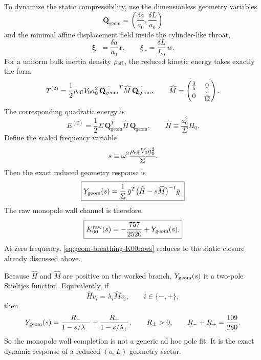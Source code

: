 \documentclass[11pt]{article}
\newcommand{\Qgeom}{\mathbf Q_{\geom}}
\newcommand{\geom}{\mathrm{geom}}
\begin{document}
To dynamize the static compressibility, use the dimensionless geometry variables
\begin{equation}
\Qgeom=\left(\frac{\delta a}{a_0},\frac{\delta L}{a_0}\right)
\label{eq:geom-breathing-Qgeom-vars}
\end{equation}
and the minimal affine displacement field inside the cylinder-like throat,
\begin{equation}
\boldsymbol\xi_\perp=\frac{\delta a}{a_0}\,\mathbf r,
\qquad
\xi_w=\frac{\delta L}{L_0}\,w.
\label{eq:geom-breathing-affine-field}
\end{equation}
For a uniform bulk inertia density \(\rho_{\rm eff}\), the reduced kinetic energy takes
exactly the form
\begin{equation}
T^{(2)}
=
\frac12\rho_{\rm eff}V_0a_0^2\,\dot{\Qgeom}^{T}\widehat M\,\dot{\Qgeom},
\qquad
\widehat M=
\begin{pmatrix}
\frac35 & 0\\[3pt]
0 & \frac1{12}
\end{pmatrix}.
\label{eq:geom-breathing-Mhat-affine}
\end{equation}
The corresponding quadratic energy is
\begin{equation}
E^{(2)}=\frac12\Sigma\,\Qgeom^{T}\widehat H\,\Qgeom,
\qquad
\widehat H\equiv \frac{a_0^2}{\Sigma}H_0.
\label{eq:geom-breathing-E2-Hhat}
\end{equation}
Define the scaled frequency variable
\begin{equation}
s\equiv \omega^2\frac{\rho_{\rm eff}V_0a_0^2}{\Sigma}.
\label{eq:geom-breathing-svar}
\end{equation}
Then the exact reduced geometry response is
\begin{equation}
\boxed{
Y_{\rm geom}(s)
=
\frac{1}{\Sigma}\,
\bar g^T\bigl(\widehat H-s\widehat M\bigr)^{-1}\bar g.
}
\label{eq:geom-breathing-Ygeom}
\end{equation}
The raw monopole wall channel is therefore
\begin{equation}
\boxed{
K_{00}^{\rm raw}(s)
=
-\frac{757}{2520}+Y_{\rm geom}(s).
}
\label{eq:geom-breathing-K00raws}
\end{equation}
At zero frequency,
\cref{eq:geom-breathing-K00raws} reduces to the static closure already discussed above.

Because \(\widehat H\) and \(\widehat M\) are positive on the worked branch,
\(Y_{\rm geom}(s)\) is a two-pole Stieltjes function.
Equivalently, if
\begin{equation}
\widehat H v_i=\lambda_i\widehat M v_i,
\qquad i\in\{-,+\},
\label{eq:geom-breathing-generalized-eigs}
\end{equation}
then
\begin{equation}
Y_{\rm geom}(s)
=
\frac{R_-}{1-s/\lambda_-}
+
\frac{R_+}{1-s/\lambda_+},
\qquad
R_\pm>0,
\qquad
R_-+R_+=\frac{109}{280}.
\label{eq:geom-breathing-two-pole}
\end{equation}
So the monopole wall completion is not a generic ad hoc pole fit.
It is the exact dynamic response of a reduced \((a,L)\) geometry sector.
\end{document}
